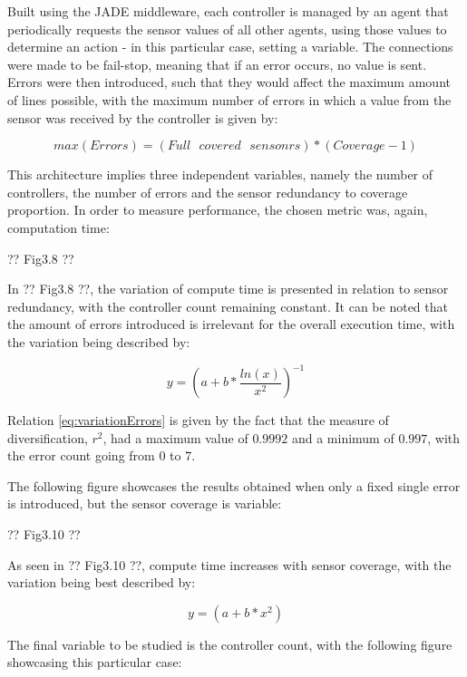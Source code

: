 \documentclass[12pt, english, a4paper]{report}
\begin{document}
Built using the JADE middleware, each controller is managed by an agent that periodically requests the sensor values of all other agents,
using those values to determine an action - in this particular case, setting a variable. The connections were made to be fail-stop, meaning
that if an error occurs, no value is sent. Errors were then introduced, such that they would affect the maximum amount of lines possible,
with the maximum number of errors in which a value from the sensor was received by the controller is given by:

\begin{equation}
    \label{eq:maxErrors}
    max(Errors) = (Full\text{ } covered \text{ } sensonrs) * (Coverage - 1) 
\end{equation}

This architecture implies three independent variables, namely the number of controllers, the number of errors and the sensor redundancy to
coverage proportion. In order to measure performance, the chosen metric was, again, computation time:

?? Fig3.8 ??

In ?? Fig3.8 ??, the variation of compute time is presented in relation to sensor redundancy, with the controller count remaining constant.
It can be noted that the amount of errors introduced is irrelevant for the overall execution time, with the variation being described by:

\begin{equation}
    \label{eq:variationErrors}
    y = \left(a + b * \frac{ln(x)}{x^2} \right)^{-1}
\end{equation}

Relation \cref{eq:variationErrors} is given by the fact that the measure of diversification, \(r^2\), had a maximum value of \(0.9992\) and a 
minimum of \(0.997\), with the error count going from 0 to 7. 

The following figure showcases the results obtained when only a fixed single error is introduced, but the sensor coverage is variable:

?? Fig3.10 ??

As seen in ?? Fig3.10 ??, compute time increases with sensor coverage, with the variation being best described by:

\begin{equation}
    \label{eq:variationCoverage}
    y = (a + b * x^2)
\end{equation}

The final variable to be studied is the controller count, with the following figure showcasing this particular case:
\end{document}
